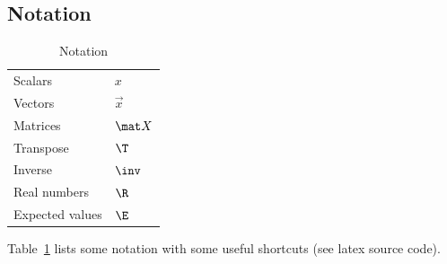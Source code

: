 \documentclass[12pt,twoside]{article}
\begin{document}
\subsection{Notation}
\begin{table}[tb]
\caption{Notation}
\label{tab:notation}
\centering
\begin{tabular}{ll}
Scalars & $x$\\
Vectors & $\vec x$\\
Matrices & $\mat X$\\
Transpose & $\T$\\
Inverse & $\inv$\\
Real numbers & $\R$\\
Expected values & $\E$\\
\end{tabular}
\end{table}
Table~\ref{tab:notation} lists some notation with some useful shortcuts (see latex source code).
\end{document}
